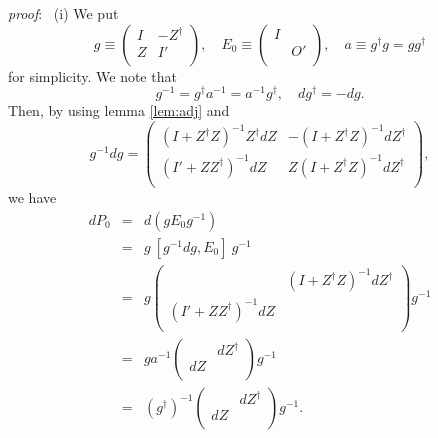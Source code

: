 \documentclass[makeidx,12pt,openany]{report}
\begin{document}
 \index{$[P_0,dP_0]$}
\textit{proof}: \ (i) 
We put 
\begin{equation}
 g \equiv \left(
           \begin{array}{cc}
               I & -Z^{\dag}  \\
               Z & I' \\
            \end{array}
         \right) , \quad 
 E_0 \equiv \left(
       \begin{array}{cc}
           I &    \\
             & O' \\
       \end{array}
    \right) , \quad 
 a \equiv g^{\dag}g=g g^{\dag}
\end{equation}
for simplicity. We note that
\begin{equation}
g^{-1}=g^{\dag}a^{-1}=a^{-1}g^{\dag}, \quad 
dg^{\dag}=-dg. \label{eqn:dag}
\end{equation}
Then, by using lemma \ref{lem:adj} and 
\begin{equation}
g^{-1}dg=
\left(
   \begin{array}{cc}
(I+Z^{\dag}Z)^{-1}Z^{\dag}dZ & 
-(I+Z^{\dag}Z)^{-1}dZ^{\dag} \\
(I'+Z Z^{\dag})^{-1}dZ & 
Z(I+Z^{\dag}Z)^{-1}dZ^{\dag} \\
   \end{array}
\right) , 
\end{equation}
we have
\begin{eqnarray*}
dP_0 &=& d(gE_0g^{-1}) \\
&=& g \ [g^{-1}dg,E_0] \ g^{-1} \\
&=& g \left(
   \begin{array}{rl}
      & (I+Z^{\dag}Z)^{-1}dZ^{\dag} \\
     (I'+Z Z^{\dag})^{-1}dZ &  \\
   \end{array}
\right) g^{-1} \\
&=& g a^{-1} \left(
           \begin{array}{cc}
                 & dZ^{\dag}  \\
              dZ &    \\
            \end{array}
         \right)  g^{-1} \\
&=& (g^{\dag})^{-1} \left(
           \begin{array}{cc}
                 & dZ^{\dag}  \\
              dZ &    \\
            \end{array}
         \right)  g^{-1}.
\end{eqnarray*}
\end{document}
